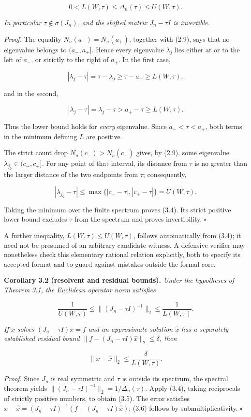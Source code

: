 \documentclass[
  11pt,
]{article}
\begin{document}
\[
0<L(W,\tau)
\le\Delta_n(\tau)
\le U(W,\tau).
\tag{3.4}
\]

\emph{In particular \(\tau\notin\sigma(J_n)\), and the shifted matrix
\(J_n-\tau I\) is invertible.}

\emph{Proof.} The equality \(N_n(a_-)=N_n(a_+)\), together with (2.9),
says that no eigenvalue belongs to \((a_-,a_+]\). Hence every eigenvalue
\(\lambda_j\) lies either at or to the left of \(a_-\), or strictly to
the right of \(a_+\). In the first case,

\[
|\lambda_j-\tau|=\tau-\lambda_j\ge\tau-a_-\ge L(W,\tau),
\]

and in the second,

\[
|\lambda_j-\tau|=\lambda_j-\tau>a_+-\tau\ge L(W,\tau).
\]

Thus the lower bound holds for \emph{every} eigenvalue. Since
\(a_-<\tau<a_+\), both terms in the minimum defining \(L\) are positive.

The strict count drop \(N_n(c_-)>N_n(c_+)\) gives, by (2.9), some
eigenvalue \(\lambda_{j_0}\in(c_-,c_+]\). For any point of that
interval, its distance from \(\tau\) is no greater than the larger
distance of the two endpoints from \(\tau\); consequently,

\[
|\lambda_{j_0}-\tau|
\le\max\{|c_--\tau|,|c_+-\tau|\}
=U(W,\tau).
\]

Taking the minimum over the finite spectrum proves (3.4). Its strict
positive lower bound excludes \(\tau\) from the spectrum and proves
invertibility. \(\square\)

A further inequality, \(L(W,\tau)\le U(W,\tau)\), follows automatically
from (3.4); it need not be presumed of an arbitrary candidate witness. A
defensive verifier may nonetheless check this elementary rational
relation explicitly, both to specify its accepted format and to guard
against mistakes outside the formal core.

\textbf{Corollary 3.2 (resolvent and residual bounds).} \emph{Under the
hypotheses of Theorem 3.1, the Euclidean operator norm satisfies}

\[
\frac1{U(W,\tau)}
\le\|(J_n-\tau I)^{-1}\|_2
\le\frac1{L(W,\tau)}.
\tag{3.5}
\]

\emph{If \(x\) solves \((J_n-\tau I)x=f\) and an approximate solution
\(\widehat x\) has a separately established residual bound
\(\|f-(J_n-\tau I)\widehat x\|_2\le\delta\), then}

\[
\|x-\widehat x\|_2\le\frac{\delta}{L(W,\tau)}.
\tag{3.6}
\]

\emph{Proof.} Since \(J_n\) is real symmetric and \(\tau\) is outside
its spectrum, the spectral theorem yields
\(\|(J_n-\tau I)^{-1}\|_2=1/\Delta_n(\tau)\). Apply (3.4), taking
reciprocals of strictly positive numbers, to obtain (3.5). The error
satisfies \(x-\widehat x=(J_n-\tau I)^{-1}(f-(J_n-\tau I)\widehat x)\);
(3.6) follows by submultiplicativity. \(\square\)
\end{document}
